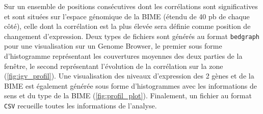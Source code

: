 \documentclass[12pt,a4paper]{report}
\begin{document}
\begin{onehalfspace}
Sur un ensemble de positions consécutives dont les corrélations sont significatives et sont situées sur l'espace génomique de la BIME (étendu de 40 pb de chaque côté), celle dont la corrélation est la plus élevée sera définie comme position de changement d'expression. Deux types de fichiers sont générés au format \texttt{bedgraph} pour une visualisation sur un Genome Browser, le premier sous forme d'histogramme représentant les couvertures moyennes des deux parties de la fenêtre, le second représentant l'évolution de la corrélation sur la zone (\autoref{fig:igv_profil}). Une visualisation des niveaux d'expression des 2 gènes et de la BIME est également générée sous forme d'histogrammes avec les informations de sens et du type de la BIME (\autoref{fig:profil_plot}). Finalement, un fichier au format \texttt{CSV} recueille toutes les informations de l'analyse.

\begin{figure}
\end{figure}


\end{onehalfspace}
\end{document}
